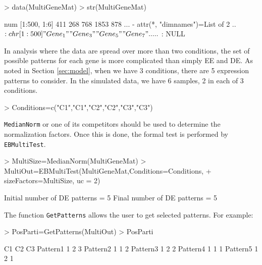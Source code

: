 \documentclass{article}
\begin{document}
\begin{Schunk}
\begin{Sinput}
> data(MultiGeneMat)
> str(MultiGeneMat)
\end{Sinput}
\begin{Soutput}
 num [1:500, 1:6] 411 268 768 1853 878 ...
 - attr(*, "dimnames")=List of 2
  ..$ : chr [1:500] "Gene_1" "Gene_3" "Gene_5" "Gene_7" ...
  ..$ : NULL
\end{Soutput}
\end{Schunk}
In analysis where the data are spread over more than two conditions,
the set of possible patterns for each gene is more complicated
than simply EE and DE. As noted in Section \ref{sec:model}, when we have 3 conditions, there are 5 expression
patterns to consider. In the simulated data, we have 6 samples, 2 in each of 3 conditions.
\begin{Schunk}
\begin{Sinput}
> Conditions=c("C1","C1","C2","C2","C3","C3")
\end{Sinput}
\end{Schunk}

\verb+MedianNorm+ or one of its competitors should be used to determine the normalization factors.
Once this is done, the formal test is performed by \verb+EBMultiTest+. 
\begin{Schunk}
\begin{Sinput}
> MultiSize=MedianNorm(MultiGeneMat)
> MultiOut=EBMultiTest(MultiGeneMat,Conditions=Conditions,
+  sizeFactors=MultiSize, uc = 2)
\end{Sinput}
\begin{Soutput}
Initial number of DE patterns = 5
Final number of DE patterns = 5
\end{Soutput}
\end{Schunk}
The function \verb+GetPatterns+ allows the user to get selected patterns. For example:

\begin{Schunk}
\begin{Sinput}
> PosParti=GetPatterns(MultiOut)
> PosParti
\end{Sinput}
\begin{Soutput}
         C1 C2 C3
Pattern1  1  2  3
Pattern2  1  1  2
Pattern3  1  2  2
Pattern4  1  1  1
Pattern5  1  2  1
\end{Soutput}
\end{Schunk}
\end{document}

